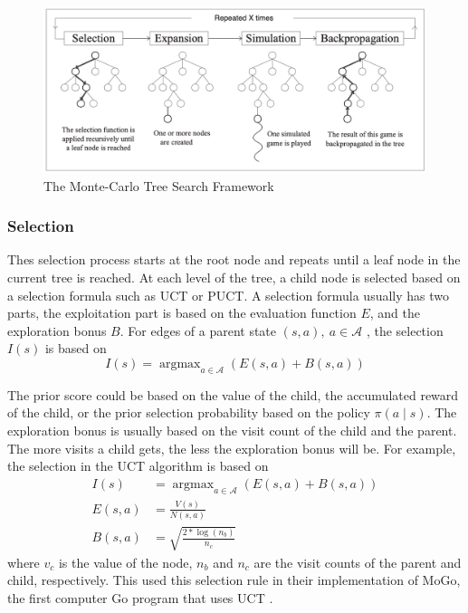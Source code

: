 \documentclass[12pt]{article}
\begin{document}
\begin{figure}[ht]
    \centering
    \includegraphics[scale=0.5]{assets/mcts.png}
    \caption[]{The Monte-Carlo Tree Search Framework}
    \label{fig:mcts}
\end{figure}

\subsubsection{Selection}
Thes selection process starts at the root node and repeats until a leaf node in the current tree is reached.
At each level of the tree, a child node is selected based on a selection formula such as UCT or PUCT.
A selection formula usually has two parts, the exploitation part is based on the evaluation function $E$, and the exploration bonus $B$.
For edges of a parent state $(s, a), ~ a \in \mathcal{A}$ , the selection $I(s)$ is based on
\begin{equation}
    \label{eq:mcts_selection}
    I(s) = \operatorname{argmax}_{a \in \mathcal{A}} \left( E(s, a) + B(s, a) \right)
\end{equation}

The prior score could be based on the value of the child, the accumulated reward of the child, or the prior selection probability based on the policy $\pi(a \mid s)$.
The exploration bonus is usually based on the visit count of the child and the parent.
The more visits a child gets, the less the exploration bonus will be.
For example, the selection in the UCT algorithm is based on
\begin{align*}
    I(s)     & = \operatorname{argmax}_{a \in \mathcal{A}} \left( E(s, a) + B(s, a) \right)  \\
    E(s, a)  & = \frac{V(s)}{N(s, a)}  \\
    B(s, a)  & = \sqrt{\frac{2 * \log(n_b)}{n_c}}
\end{align*}
where $v_c$ is the value of the node, $n_b$ and $n_c$ are the visit counts of the parent and child, respectively.
This \citeauthor{ModificationUCTPatterns_Gelly.Wang.ea_2006} used this selection rule in their implementation of MoGo,
the first computer Go program that uses UCT \cite{ModificationUCTPatterns_Gelly.Wang.ea_2006}.
\end{document}
